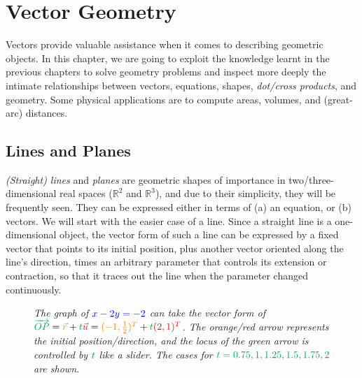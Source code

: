 \chapter{Vector Geometry}

Vectors provide valuable assistance when it comes to describing geometric objects. In this chapter, we are going to exploit the knowledge learnt in the previous chapters to solve geometry problems and inspect more deeply the intimate relationships between vectors, equations, shapes, \textit{dot/cross products}, and geometry. Some physical applications are to compute areas, volumes, and (great-arc) distances. 

\section{Lines and Planes}
\textit{(Straight) lines} and \textit{planes} are geometric shapes of importance in two/three-dimensional real spaces ($\mathbb{R}^2$ and $\mathbb{R}^3$), and due to their simplicity, they will be frequently seen. They can be expressed either in terms of (a) an equation, or (b) vectors. We will start with the easier case of a line. Since a straight line is a one-dimensional object, the vector form of such a line can be expressed by a fixed vector that points to its initial position, plus another vector oriented along the line's direction, times an arbitrary parameter that controls its extension or contraction, so that it traces out the line when the parameter changed continuously.
\begin{figure}[ht!]
    \centering
    \caption{\textit{The graph of $\color{blue}x - 2y = -2$ can take the vector form of $\smash{\color{Green}\overrightarrow{OP}} = {\color{orange}\vec{r}} + {\color{Green}t} {\color{red}\vec{u}} = {\color{orange}(-1,\frac{1}{2})^T} + {\color{Green}t}{\color{red}(2,1)^T}$. The orange/red arrow represents the initial position/direction, and the locus of the green arrow is controlled by $\color{Green}t$ like a slider. The cases for $\color{Green}t = 0.75, 1, 1.25, 1.5, 1.75, 2$ are shown.}}
    \label{fig:vectraceline}
\end{figure}\par
